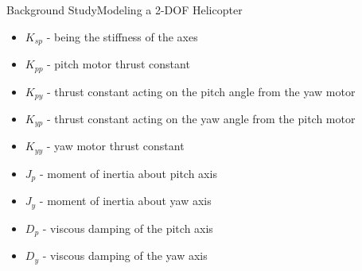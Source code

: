 \documentclass{beamer}
\begin{document}
\begin{frame}{Background Study}{Modeling a 2-DOF Helicopter}
\begin{itemize}
    \item $K_{sp}$ - being the stiffness of the axes
    \item $K_{pp}$ - pitch motor thrust constant
    \item $K_{py}$ - thrust constant acting on the pitch angle from the yaw motor
    \item $K_{yp}$ - thrust constant acting on the yaw angle from the pitch motor
    \item $K_{yy}$ - yaw motor thrust constant
    \item $J_p$ - moment of inertia about pitch axis
    \item $J_y$ - moment of inertia about yaw axis
    \item $D_p$ - viscous damping of the pitch axis
    \item $D_y$ - viscous damping of the yaw axis
\end{itemize}
\end{frame}
\end{document}
